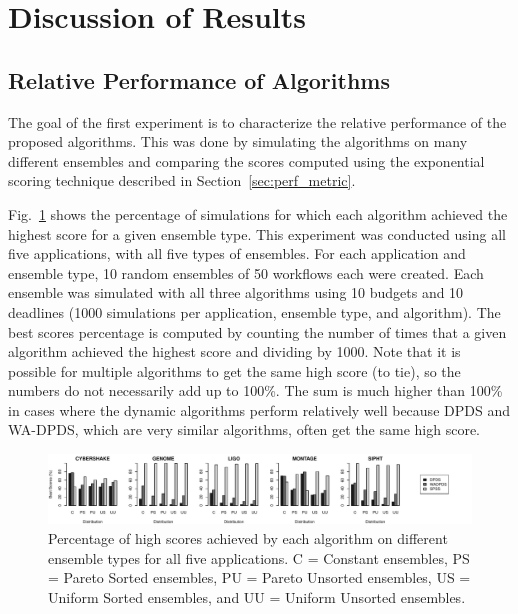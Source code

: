 \documentclass[conference]{IEEEtran}
\begin{document}
\section{Discussion of Results}
\label{sec:results}



\subsection{Relative Performance of Algorithms}

The goal of the first experiment is to characterize the relative performance
of the proposed algorithms. This was done by simulating the algorithms on many
different ensembles and comparing the scores computed using the exponential
scoring technique described in Section~\ref{sec:perf_metric}.

Fig.~\ref{fig:distributions} shows the percentage of simulations for which
each algorithm achieved the highest score for a given ensemble type. This
experiment was conducted using all five applications, with all five types of
ensembles. For each application and ensemble type, 10 random ensembles of 50
workflows each were created. Each ensemble was simulated with all three
algorithms using 10 budgets and 10 deadlines (1000 simulations per
application, ensemble type, and algorithm). The best scores percentage is
computed by counting the number of times that a given algorithm achieved the
highest score and dividing by 1000. Note that it is possible for multiple
algorithms to get the same high score (to tie), so the numbers do not
necessarily add up to 100\%. The sum is much higher than 100\% in cases where
the dynamic algorithms perform relatively well because DPDS and WA-DPDS, which
are very similar algorithms, often get the same high score.

\begin{figure}[ht]
    \centering
    \includegraphics[width=\textwidth]{run-finish-variations-test-0-output-distributions}
    \caption{Percentage of high scores achieved by each algorithm on different ensemble types for all five applications. C = Constant ensembles, PS = Pareto Sorted ensembles, PU = Pareto Unsorted ensembles, US = Uniform Sorted ensembles, and UU = Uniform Unsorted ensembles.} 
    \label{fig:distributions}
\end{figure}
\end{document}
